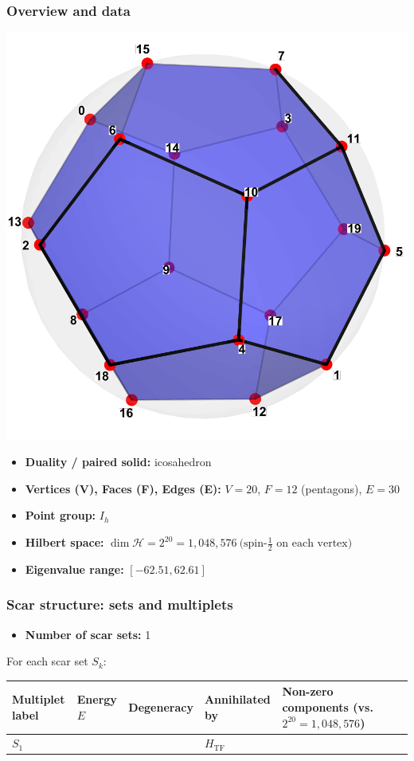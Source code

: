 \documentclass[11pt,a4paper]{article}
\newcommand{\Htf}{H_{\mathrm{TF}}}
\begin{document}
\subsubsection*{Overview and data}
\begin{center}
  \includegraphics[width=.6\linewidth]{dodecahedron}
\end{center}

\begin{itemize}[leftmargin=1.5em]
  \item \textbf{Duality / paired solid:} icosahedron
  \item \textbf{Vertices (V), Faces (F), Edges (E):} $V = 20$,\; $F = 12$ (pentagons),\; $E = 30$
  \item \textbf{Point group:} $I_h$
  \item \textbf{Hilbert space:} \(
        \dim\mathcal{H} = 2^{20} = 1,048,576\ \text{(spin-$\tfrac12$ on each vertex)}
        \)
  \item \textbf{Eigenvalue range:} $[-62.51, 62.61]$
\end{itemize}

\subsubsection*{Scar structure: sets and multiplets}

\begin{itemize}[leftmargin=1.5em]
  \item \textbf{Number of scar sets:} 1
  \end{itemize}
  \hspace{6mm}For each scar set $S_k$:\\

\begin{center}
\begin{tabular}{L{3.5cm} C{2.2cm} C{2.2cm} C{2.2cm} C{3.0cm} C{3.2cm}}
\toprule
\textbf{Multiplet label} & \textbf{Energy $E$} & \textbf{Degeneracy} & \textbf{Annihilated by} & \textbf{Non-zero components (vs.\ $2^{20} = 1,048,576$)} \\
\midrule
$S_1$ &  & & $\Htf$ & \\
\bottomrule
\end{tabular}
\end{center}
\end{document}
